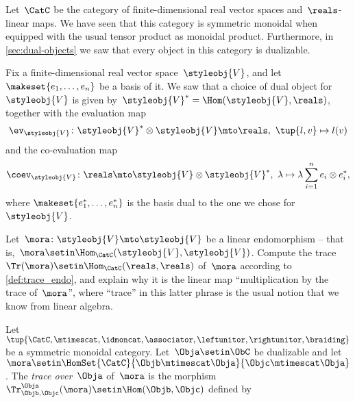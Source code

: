 \begin{gradedexercise}
    \label{ex:LinearAlgebraTrace}
    Let~$\CatC$ be the category of finite-dimensional real vector spaces and~$\reals$-linear maps.
    We have seen that this category is symmetric monoidal when equipped with the usual tensor product as monoidal product.
    Furthermore, in \cref{sec:dual-objects} we saw that every object in this category is dualizable.

    Fix a finite-dimensional real vector space~$\styleobj{V}$, and let~$\makeset{e_1,\ldots,e_n }$ be a basis of it.
    We saw that a choice of dual object for~$\styleobj{V}$ is given by~$\styleobj{V}^* = \Hom(\styleobj{V}, \reals)$, together with the evaluation map
    \begin{equation}
        \ev_\styleobj{V}  \colon \styleobj{V}^* \otimes \styleobj{V}  \mto \reals, \ \tup{l, v} \mapsto l(v)
    \end{equation}
    and the co-evaluation map
    \begin{equation}
        \coev_\styleobj{V}  \colon \reals \mto \styleobj{V}  \otimes \styleobj{V}^*, \ \lambda \mapsto \lambda \sum_{i=1}^n e_i \otimes e_i^*,
    \end{equation}
    where $\makeset{e_1^*,\ldots,e_n^* }$ is the basis dual to the one we chose for~$\styleobj{V}$.

    Let~$\mora\colon \styleobj{V} \mto \styleobj{V}$ be a linear endomorphism -- that is,~$\mora \setin \Hom_\CatC(\styleobj{V}, \styleobj{V})$.
    Compute the trace~$\Tr(\mora) \setin \Hom_\CatC(\reals, \reals)$ of~$\mora$ according to \cref{def:trace_endo}, and explain why it is the linear map ``multiplication by the trace of~$\mora$'', where ``trace'' in this latter phrase is the usual notion that we know from linear algebra.
\end{gradedexercise}

\begin{widepar}
    \begin{ctdefinition}
        \label{def:trace_gen_endo}
        Let~$\tup{\CatC,\mtimescat, \idmoncat, \associator, \leftunitor, \rightunitor, \braiding}$ be a symmetric monoidal category.
        Let~$\Obja \setin \ObC$ be dualizable and let~$\mora \setin \HomSet{\CatC}{\Objb \mtimescat \Obja}{\Objc \mtimescat \Obja}$.
        The \emph{trace over}~$\Obja$ of~$\mora$ is the morphism~$\Tr_{\Objb, \Objc}^\Obja (\mora) \setin \Hom(\Objb, \Objc)$ defined by
    \end{ctdefinition}
\end{widepar}

